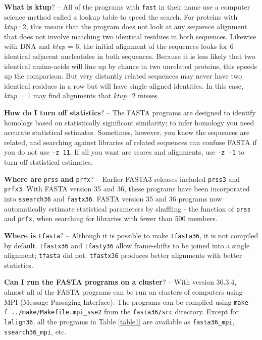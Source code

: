 \documentclass[11pt]{article}
\begin{document}
\vspace{0.5ex}
{\noindent}\textbf{What is ktup}? -- All of the programs with \texttt{fast} in their
name use a computer science method called a lookup table to speed the
search.  For proteins with \emph{ktup}=2, this means that the program
does not look at any sequence alignment that does not involve matching
two identical residues in both sequences.  Likewise with DNA and
\emph{ktup} = 6, the initial alignment of the sequences looks for 6
identical adjacent nucleotides in both sequences.  Because it is less
likely that two identical amino-acids will line up by chance in two
unrelated proteins, this speeds up the comparison.  But very distantly
related sequences may never have two identical residues in a row but
will have single aligned identities.  In this case, \emph{ktup} = 1 may
find alignments that \emph{ktup}=2 misses.

\vspace{0.5ex} {\noindent}\textbf{How do I turn off statistics}? --
The FASTA programs are designed to identify homologs based on
statistically significant similarity; to infer homology you need
accurate statistical estimates.  Sometimes, however, you know the
sequences are related, and searching against libraries of related
sequences can confuse FASTA if you do not use \texttt{-z 11}. If all
you want are scores and alignments, use \texttt{-z -1} to turn off
statistical estimates.

\vspace{0.5ex}
{\noindent}\textbf{Where are} \texttt{prss} {\noindent}\textbf{and} \texttt{prfx}? -- Earlier FASTA3
releases included \texttt{prss3} and \texttt{prfx3}. With FASTA
version 35 and 36, these programs have been incorporated into
\texttt{ssearch36} and \texttt{fastx36}.  FASTA version 35 and 36
programs now automatically estimate statistical parameters by
shuffling - the function of \texttt{prss} and \texttt{prfx}, when
searching for libraries with fewer than 500 members.

\vspace{0.5ex}
{\noindent}\textbf{Where is} \texttt{tfasta}? -- Although it is possible to make
\texttt{tfasta36}, it is not compiled by default.  \texttt{tfastx36}
and \texttt{tfasty36} allow frame-shifts to be joined into a single
alignment; \texttt{tfasta} did not. \texttt{tfastx36} produces better
alignments with better statistics.

\vspace{0.5ex}
{\noindent}\textbf{Can I run the FASTA programs on a cluster}? -- With version
36.3.4, almost all of the FASTA programs can be run on clusters of
computers using MPI (Message Passaging Interface).  The programs can
be compiled using \texttt{make -f ../make/Makefile.mpi\_sse2} from the
\texttt{fasta36/src} directory.  Except for \texttt{lalign36}, all the
programs in Table \ref{table1} are available as \texttt{fasta36\_mpi},
\texttt{ssearch36\_mpi}, etc.
\end{document}
